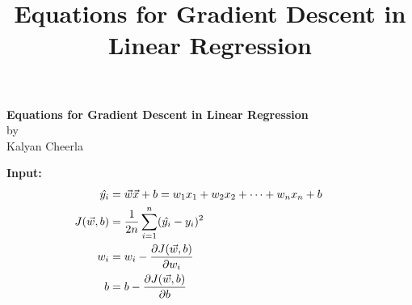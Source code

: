 \documentclass[11pt]{article}
\begin{document}
\title{Equations for Gradient Descent in Linear Regression}

\begin{center}
    {\LARGE \bf Equations for Gradient Descent in Linear Regression}\\
    by\\
    {\large Kalyan Cheerla}
\end{center}

\textbf{Input:}
\begin{align}
    \hat{y_i} &= \vec{w}\vec{x}+b = w_1 x_1 + w_2 x_2 +\dots+ w_n x_n + b \\
    J(\vec{w}, b) &= \frac{1}{2n} \displaystyle\sum_{i=1}^{n} (\hat{y_i} - y_i)^2 \\
    w_i &= w_i - \frac{\partial{J(\vec{w}, b)}}{\partial{w_i}} \\
    b &= b - \frac{\partial{J(\vec{w}, b)}}{\partial{b}} \notag &&
\end{align}
\end{document}
